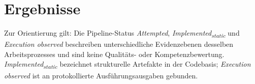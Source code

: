 \chapter{Ergebnisse}
\label{chap:results}

Zur Orientierung gilt: Die Pipeline-Status \textit{Attempted}, \textit{Implemented\textsubscript{static}} und \textit{Execution observed} beschreiben unterschiedliche Evidenzebenen desselben Arbeitsprozesses und sind keine Qualitäts- oder Kompetenzbewertung. \textit{Implemented\textsubscript{static}} bezeichnet strukturelle Artefakte in der Codebasis; \textit{Execution observed} ist an protokollierte Ausführungsausgaben gebunden.








